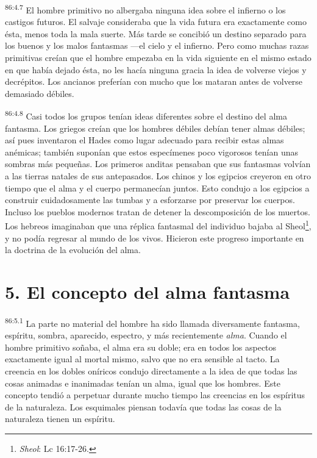 \par
\textsuperscript{86:4.7} El hombre primitivo no albergaba ninguna idea sobre el infierno o los castigos futuros. El salvaje consideraba que la vida futura era exactamente como ésta, menos toda la mala suerte. Más tarde se concibió un destino separado para los buenos y los malos fantasmas ---el cielo y el infierno. Pero como muchas razas primitivas creían que el hombre empezaba en la vida siguiente en el mismo estado en que había dejado ésta, no les hacía ninguna gracia la idea de volverse viejos y decrépitos. Los ancianos preferían con mucho que los mataran antes de volverse demasiado débiles.

\par
\textsuperscript{86:4.8} Casi todos los grupos tenían ideas diferentes sobre el destino del alma fantasma. Los griegos creían que los hombres débiles debían tener almas débiles; así pues inventaron el Hades como lugar adecuado para recibir estas almas anémicas; también suponían que estos especímenes poco vigorosos tenían unas sombras más pequeñas. Los primeros anditas pensaban que sus fantasmas volvían a las tierras natales de sus antepasados. Los chinos y los egipcios creyeron en otro tiempo que el alma y el cuerpo permanecían juntos. Esto condujo a los egipcios a construir cuidadosamente las tumbas y a esforzarse por preservar los cuerpos. Incluso los pueblos modernos tratan de detener la descomposición de los muertos. Los hebreos imaginaban que una réplica fantasmal del individuo bajaba al Sheol\footnote{\textit{Sheol}: Lc 16:17-26.}, y no podía regresar al mundo de los vivos. Hicieron este progreso importante en la doctrina de la evolución del alma.

\section*{5. El concepto del alma fantasma}
\par
\textsuperscript{86:5.1} La parte no material del hombre ha sido llamada diversamente fantasma, espíritu, sombra, aparecido, espectro, y más recientemente \textit{alma}. Cuando el hombre primitivo soñaba, el alma era su doble; era en todos los aspectos exactamente igual al mortal mismo, salvo que no era sensible al tacto. La creencia en los dobles oníricos condujo directamente a la idea de que todas las cosas animadas e inanimadas tenían un alma, igual que los hombres. Este concepto tendió a perpetuar durante mucho tiempo las creencias en los espíritus de la naturaleza. Los esquimales piensan todavía que todas las cosas de la naturaleza tienen un espíritu.

